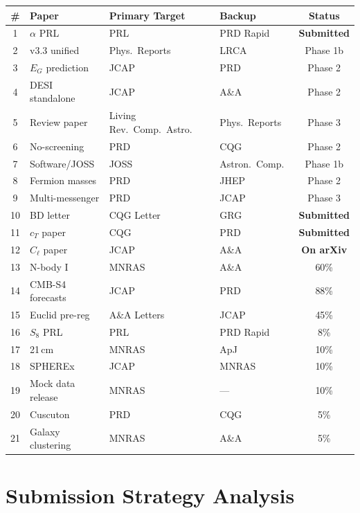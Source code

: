 \documentclass[11pt,a4paper]{article}
\begin{document}
\begin{center}
\begin{longtable}{clllc}
\toprule
\textbf{\#} & \textbf{Paper} & \textbf{Primary Target} & \textbf{Backup} & \textbf{Status} \\
\midrule
\endhead
1 & $\alpha$ PRL & PRL & PRD Rapid & \textbf{Submitted} \\
2 & v3.3 unified & Phys.\ Reports & LRCA & Phase 1b \\
3 & $E_G$ prediction & JCAP & PRD & Phase 2 \\
4 & DESI standalone & JCAP & A\&A & Phase 2 \\
5 & Review paper & Living Rev.\ Comp.\ Astro.\ & Phys.\ Reports & Phase 3 \\
6 & No-screening & PRD & CQG & Phase 2 \\
7 & Software/JOSS & JOSS & Astron.\ Comp.\ & Phase 1b \\
8 & Fermion masses & PRD & JHEP & Phase 2 \\
9 & Multi-messenger & PRD & JCAP & Phase 3 \\
10 & BD letter & CQG Letter & GRG & \textbf{Submitted} \\
11 & $c_T$ paper & CQG & PRD & \textbf{Submitted} \\
12 & $C_\ell$ paper & JCAP & A\&A & \textbf{On arXiv} \\
\midrule
13 & N-body I & MNRAS & A\&A & 60\% \\
14 & CMB-S4 forecasts & JCAP & PRD & 88\% \\
15 & Euclid pre-reg & A\&A Letters & JCAP & 45\% \\
16 & $S_8$ PRL & PRL & PRD Rapid & 8\% \\
17 & 21\,cm & MNRAS & ApJ & 10\% \\
18 & SPHEREx & JCAP & MNRAS & 10\% \\
19 & Mock data release & MNRAS & --- & 10\% \\
20 & Cuscuton & PRD & CQG & 5\% \\
21 & Galaxy clustering & MNRAS & A\&A & 5\% \\
\bottomrule
\end{longtable}
\end{center}

\section{Submission Strategy Analysis}
\end{document}
